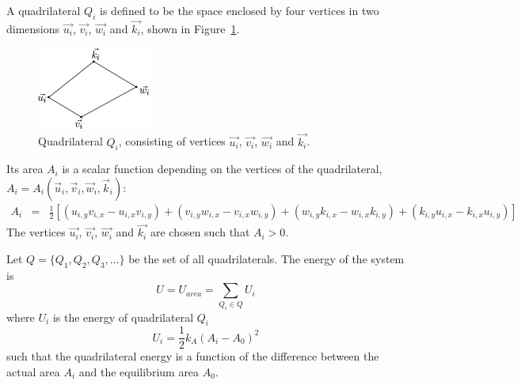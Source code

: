 A quadrilateral $Q_i$ is defined to be the space enclosed by four vertices in two dimensions  $\vec{u_i}$, $\vec{v_i}$, $\vec{w_i}$ and $\vec{k_i}$, shown in Figure~\ref{Tetrahedron}.
\begin{figure}[ht]
\begin{center}
\includegraphics[width=0.33\textwidth, clip=true]{./Chapters/03_GLM/./Images/Quadrilateral} 
\caption{Quadrilateral $Q_i$, consisting of vertices $\vec{u_i}$, $\vec{v_i}$, $\vec{w_i}$ and $\vec{k_i}$.}
\label{Tetrahedron}
\end{center}
\end{figure}
Its area $A_i$ is a scalar function depending on the vertices of the quadrilateral,~$A_i=A_i(\vec{u}_i, \vec{v}_i, \vec{w}_i, \vec{k}_i)$: 
\begin{eqnarray}
A_i&=&\frac{1}{2}
\left[\left( u_{i,y} v_{i,x} - u_{i,x} v_{i,y} \right) + \left( v_{i,y} w_{i,x} - v_{i,x} w_{i,y} \right) + \left( w_{i,y} k_{i,x} - w_{i,x} k_{i,y} \right) + \left( k_{i,y} u_{i,x} - k_{i,x} u_{i,y} \right) \right]
\label{areaQ}
\end{eqnarray}
The vertices $\vec{u_i}$, $\vec{v_i}$, $\vec{w_i}$ and $\vec{k_i}$ are chosen such that $A_i > 0$.

Let $Q = \{Q_1, Q_2, Q_3, ...\}$ be the set of all quadrilaterals. The energy of the system is
\begin{equation}
U=U_{area}=\sum\limits_{Q_i\in Q}U_i
\end{equation}
where $U_i$ is the energy of quadrilateral $Q_i$
\begin{equation}
U_i=\frac{1}{2}k_A \left(A_i-A_0\right)^2
\end{equation}
such that the quadrilateral energy is a function of the difference between the actual area $A_i$ and the equilibrium area $A_0$. 

